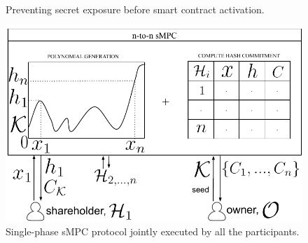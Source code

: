 \begin{figure}[t]
	\centering
	\\
	\vspace*{2pt}
	\caption{Preventing secret exposure before smart contract activation.}%
	\label{fig:key_delayed_wrap}%
\end{figure}

\begin{figure}[t]
	\centering
	\includegraphics[width=0.75\columnwidth]{fig/mpc_rev_1.pdf}
	\caption{Single-phase sMPC protocol jointly executed by all the participants.}
	\label{fig:mpc1}
\end{figure}


